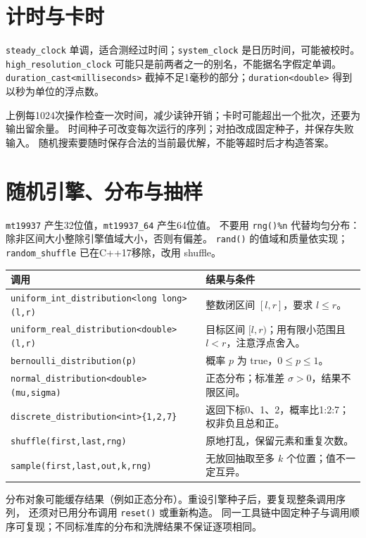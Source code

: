 \newpage
\section{计时与卡时}
\texttt{steady\_clock} 单调，适合测经过时间；\texttt{system\_clock} 是日历时间，可能被校时。
\texttt{high\_resolution\_clock} 可能只是前两者之一的别名，不能据名字假定单调。
\texttt{duration\_cast<milliseconds>} 截掉不足1毫秒的部分；\texttt{duration<double>} 得到以秒为单位的浮点数。

上例每1024次操作检查一次时间，减少读钟开销；卡时可能超出一个批次，还要为输出留余量。
时间种子可改变每次运行的序列；对拍改成固定种子，并保存失败输入。
随机搜索要随时保存合法的当前最优解，不能等超时后才构造答案。

\section{随机引擎、分布与抽样}
\texttt{mt19937} 产生32位值，\texttt{mt19937\_64} 产生64位值。
不要用 \texttt{rng()\%n} 代替均匀分布：除非区间大小整除引擎值域大小，否则有偏差。
\texttt{rand()} 的值域和质量依实现；\texttt{random\_shuffle} 已在C++17移除，改用 shuffle。
\begin{longtable}{p{84mm}p{75mm}}\toprule 调用 & 结果与条件\\\midrule\endhead
\texttt{uniform\_int\_distribution<long long>(l,r)} & 整数闭区间 $[l,r]$，要求 $l\le r$。\\
\texttt{uniform\_real\_distribution<double>(l,r)} & 目标区间 $[l,r)$；用有限小范围且 $l<r$，注意浮点舍入。\\
\texttt{bernoulli\_distribution(p)} & 概率 $p$ 为 true，$0\le p\le1$。\\
\texttt{normal\_distribution<double>(mu,sigma)} & 正态分布；标准差 $\sigma>0$，结果不限区间。\\
\texttt{discrete\_distribution<int>\{1,2,7\}} & 返回下标0、1、2，概率比1:2:7；权非负且总和正。\\
\texttt{shuffle(first,last,rng)} & 原地打乱，保留元素和重复次数。\\
\texttt{sample(first,last,out,k,rng)} & 无放回抽取至多 $k$ 个位置；值不一定互异。\\\bottomrule
\end{longtable}
分布对象可能缓存结果（例如正态分布）。重设引擎种子后，要复现整条调用序列，
还须对已用分布调用 \texttt{reset()} 或重新构造。
同一工具链中固定种子与调用顺序可复现；不同标准库的分布和洗牌结果不保证逐项相同。

